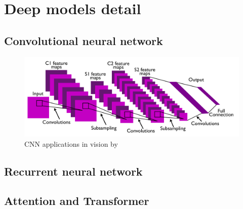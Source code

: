 \section{Deep models detail}
\label{sec:Deep models detail}
\subsection{Convolutional neural network}
\citet{fukushima1980neocognitron}

\citet{zhang1988shift}

\begin{figure}[ht!]
    \centering
    \includegraphics[width=\textwidth]{literature/imgs/ext-lecun-cnn-arch.png}
    \caption{CNN applications in vision by \citet{lecun2010convolutional}}
    \label{fig:ext-lecun-cnn-arch}
\end{figure}

\citet{lecun2010convolutional}

\citet{gu2018recent}

\subsection{Recurrent neural network}
\citet{jordan1997serial}

\citet{hochreiter1997long}

\citet{sherstinsky2020fundamentals}

\citet{chung2014empirical}

\subsection{Attention and Transformer}
\citet{bahdanau2016neural}

